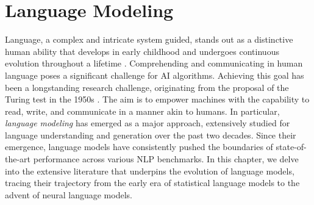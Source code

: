 \chapter{Language Modeling}
\label{chapter:related-language-modeling}


\renewcommand{\leftmark}{\spacedlowsmallcaps{Language Modeling}}


\minitoc







Language, a complex and intricate system guided, stands out as a distinctive human ability that develops in early childhood and undergoes continuous evolution throughout a lifetime \citep{hauser2002faculty}. Comprehending and communicating in human language poses a significant challenge for \ac{AI} algorithms. Achieving this goal has been a longstanding research challenge, originating from the proposal of the Turing test in the 1950s \citep{turing1950computing}. The aim is to empower machines with the capability to read, write, and communicate in a manner akin to humans. In particular, \textit{language modeling} has emerged as a major approach, extensively studied for language understanding and generation over the past two decades. Since their emergence, language models have consistently pushed the boundaries of state-of-the-art performance across various \ac{NLP} benchmarks. In this chapter, we delve into the extensive literature that underpins the evolution of language models, tracing their trajectory from the early era of statistical language models to the advent of neural language models. 

